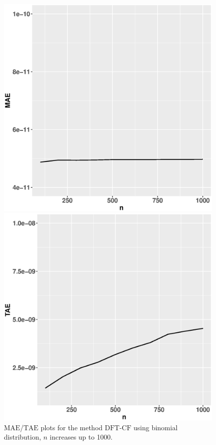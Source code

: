 \documentclass[12pt]{article}
\newcommand{\TAE}{{\textrm{TAE}}}
\newcommand{\MAE}{{\textrm{MAE}}}
\newcommand{\dft}{{\textrm{DFT-CF}}}
\begin{document}
\begin{figure}
    \centering
    \begin{minipage}{0.45\textwidth}
        \centering
        \includegraphics[width=1\textwidth]{figures/bino_mae.eps}
    \end{minipage}\hfill
    \begin{minipage}{0.45\textwidth}
        \centering
        \includegraphics[width=1\textwidth]{figures/bino_tae.eps}
    \end{minipage}
    \caption{$\MAE$/$\TAE$ plots for the method $\dft$ using binomial distribution, $n$ increases up to 1000.}
    \label{fig:mae.tae.bino}
\end{figure}
\end{document}
